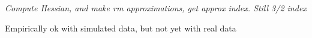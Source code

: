 \documentclass[english]{article}
\begin{document}
\emph{Compute Hessian, and make rm approximations, get approx index. Still 3/2 index}

Empirically ok with simulated data, but not yet with real data
%
%
%
%
%
\eenum

%
%
%
%
%
%
%
%
%
%
%
\end{document}
